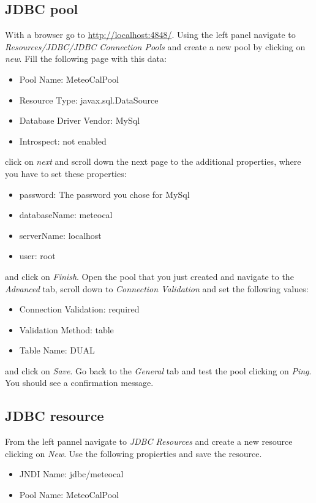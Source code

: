 \documentclass[10pt,a4paper,titlepage]{article}
\begin{document}
\subsection{JDBC pool}
With a browser go to \url{http://localhost:4848/}. Using the left panel navigate to \emph{Resources/JDBC/JDBC Connection Pools} and create a new pool by clicking on \emph{new}. Fill the following page with this data:
\begin{itemize}
\item Pool Name: MeteoCalPool
\item Resource Type: javax.sql.DataSource
\item Database Driver Vendor: MySql
\item Introspect: not enabled
\end{itemize}
click on \emph{next} and scroll down the next page to the additional properties, where you have to set these properties:
\begin{itemize}
\item password: The password you chose for MySql
\item databaseName: meteocal
\item serverName: localhost
\item user: root
\end{itemize}
and click on \emph{Finish}. Open the pool that you just created and navigate to the \emph{Advanced} tab, scroll down to \emph{Connection Validation} and set the following values:
\begin{itemize}
\item Connection Validation: required
\item Validation Method: table
\item Table Name: DUAL
\end{itemize}
and click on \emph{Save}. Go back to the \emph{General} tab and test the pool clicking on \emph{Ping}. You should see a confirmation message.

\subsection{JDBC resource}
From the left pannel navigate to \emph{JDBC Resources} and create a new resource clicking on \emph{New}. Use the following propierties and save the resource.
\begin{itemize}
\item JNDI Name: jdbc/meteocal
\item Pool Name: MeteoCalPool
\end{itemize}
\end{document}
